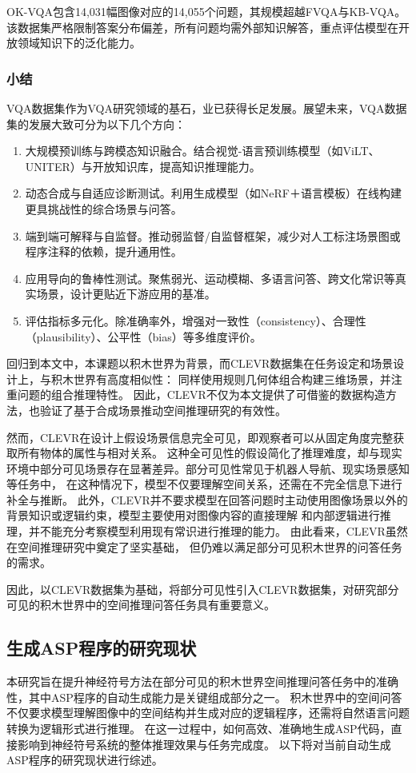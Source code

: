 OK-VQA\cite{marino2019ok}包含14,031幅图像对应的14,055个问题，其规模超越FVQA与KB-VQA。该数据集严格限制答案分布偏差，所有问题均需外部知识解答，重点评估模型在开放领域知识下的泛化能力。
\subsubsection{小结}
VQA数据集作为VQA研究领域的基石，业已获得长足发展。展望未来，VQA数据集的发展大致可分为以下几个方向：
\begin{enumerate}[nosep]
\item 大规模预训练与跨模态知识融合。结合视觉-语言预训练模型（如ViLT、UNITER）与开放知识库，提高知识推理能力。
\item 动态合成与自适应诊断测试。利用生成模型（如NeRF＋语言模板）在线构建更具挑战性的综合场景与问答。
\item 端到端可解释与自监督。推动弱监督/自监督框架，减少对人工标注场景图或程序注释的依赖，提升通用性。
\item 应用导向的鲁棒性测试。聚焦弱光、运动模糊、多语言问答、跨文化常识等真实场景，设计更贴近下游应用的基准。
\item 评估指标多元化。除准确率外，增强对一致性（consistency）、合理性（plausibility）、公平性（bias）等多维度评价。
\end{enumerate}

回归到本文中，本课题以积木世界为背景，而CLEVR数据集在任务设定和场景设计上，与积木世界有高度相似性：
同样使用规则几何体组合构建三维场景，并注重问题的组合推理特性。
因此，CLEVR不仅为本文提供了可借鉴的数据构造方法，也验证了基于合成场景推动空间推理研究的有效性。

然而，CLEVR在设计上假设场景信息完全可见，即观察者可以从固定角度完整获取所有物体的属性与相对关系。
这种全可见性的假设简化了推理难度，却与现实环境中部分可见场景存在显著差异。部分可见性常见于机器人导航、现实场景感知等任务中，
在这种情况下，模型不仅要理解空间关系，还需在不完全信息下进行补全与推断。
此外，CLEVR并不要求模型在回答问题时主动使用图像场景以外的背景知识或逻辑约束，模型主要使用对图像内容的直接理解
和内部逻辑进行推理，并不能充分考察模型利用现有常识进行推理的能力。
由此看来，CLEVR虽然在空间推理研究中奠定了坚实基础，
但仍难以满足部分可见积木世界的问答任务的需求。

因此，以CLEVR数据集为基础，将部分可见性引入CLEVR数据集，对研究部分可见的积木世界中的空间推理问答任务具有重要意义。
\subsection{生成ASP程序的研究现状}
本研究旨在提升神经符号方法在部分可见的积木世界空间推理问答任务中的准确性，其中ASP程序的自动生成能力是关键组成部分之一。
积木世界中的空间问答不仅要求模型理解图像中的空间结构并生成对应的逻辑程序，还需将自然语言问题转换为逻辑形式进行推理。
在这一过程中，如何高效、准确地生成ASP代码，直接影响到神经符号系统的整体推理效果与任务完成度。
以下将对当前自动生成ASP程序的研究现状进行综述。

